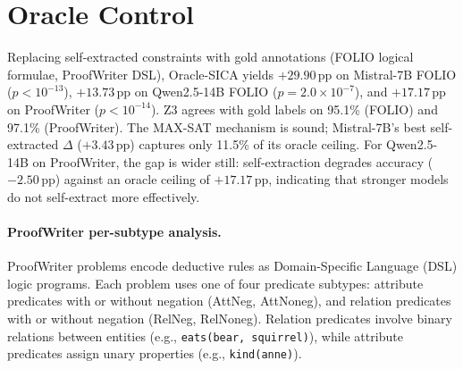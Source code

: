 \begin{table}[h]
\centering
\small
\caption{Summary of three representative discordant cases. All occur at exact 6:6 vote ties. Constraint exclusion can break ties in either direction (Cases 1--2) or have no effect (Case 3).}
\label{tab:case_summary}
\end{table}


\section{Oracle Control}
\label{app:oracle}
\label{sec:oracle}
\label{app:pw-oracle-subtype}

Replacing self-extracted constraints with gold annotations (FOLIO logical formulae, ProofWriter DSL), Oracle-SICA yields $+29.90$\,pp on Mistral-7B FOLIO ($p < 10^{-13}$), $+13.73$\,pp on Qwen2.5-14B FOLIO ($p = 2.0 \times 10^{-7}$), and $+17.17$\,pp on ProofWriter ($p < 10^{-14}$). Z3 agrees with gold labels on 95.1\% (FOLIO) and 97.1\% (ProofWriter). The MAX-SAT mechanism is sound; Mistral-7B's best self-extracted $\Delta$ ($+3.43$\,pp) captures only 11.5\% of its oracle ceiling. For Qwen2.5-14B on ProofWriter, the gap is wider still: self-extraction degrades accuracy ($-2.50$\,pp) against an oracle ceiling of $+17.17$\,pp, indicating that stronger models do not self-extract more effectively.

\paragraph{ProofWriter per-subtype analysis.} ProofWriter problems encode deductive rules as Domain-Specific Language (DSL) logic programs. Each problem uses one of four predicate subtypes: attribute predicates with or without negation (AttNeg, AttNoneg), and relation predicates with or without negation (RelNeg, RelNoneg). Relation predicates involve binary relations between entities (e.g., \texttt{eats(bear, squirrel)}), while attribute predicates assign unary properties (e.g., \texttt{kind(anne)}).

